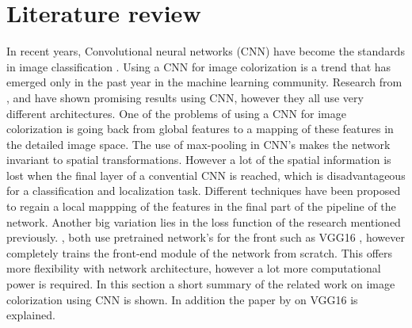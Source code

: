 \section{Literature review} \label{sec:litreview}
 
In recent years, Convolutional neural networks (CNN) have become the standards in image
classification \cite{Krizhevsky}. Using a CNN for image colorization is a trend that has emerged only in the past year in the machine learning community. Research from \cite{Dahl}, \cite{Zhang}
and \cite{Cheng} have shown promising results using CNN, however they all use very different
architectures. One of the problems of using a CNN for image colorization is going back from global features to a mapping of these features in the detailed image space. The use of max-pooling in CNN's makes the network invariant to spatial transformations. However a lot of the spatial information is lost when the final layer of a convential CNN is reached, which is disadvantageous for a classification and localization task. Different techniques have been proposed to regain a local mappping of the features in the final part of the pipeline of the network. Another big variation lies in the loss function of the research mentioned previously. \cite{Dahl}, \cite{Zhang} both use pretrained network's for the front such as VGG16 \cite{Simonyan}, however \cite{cheng}
completely trains the front-end module of the network from scratch. This offers more flexibility with network architecture, however a lot more computational power is required. In
this section a short summary of the related work on image colorization using CNN is shown. In addition the paper by \cite{Simonyan} on VGG16 is explained.

